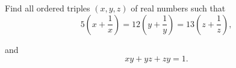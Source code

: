 Find all ordered triples $ (x, y, z)$ of real numbers such that\[ 5 \left(x +  \frac{1}{x} \right) = 12 \left(y +  \frac{1}{y} \right) = 13 \left(z +  \frac{1}{z} \right),\]

and \[ xy + yz + zy = 1.\]